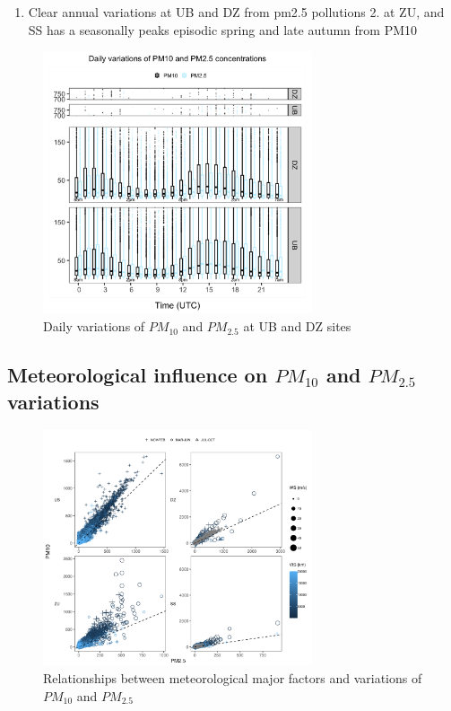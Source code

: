 \documentclass[
  11pt,
]{article}
\providecommand{\tightlist}{%
  \setlength{\itemsep}{0pt}\setlength{\parskip}{0pt}}
\begin{document}
\begin{enumerate}
\def\labelenumi{\arabic{enumi}.}
\tightlist
\item
  Clear annual variations at UB and DZ from pm2.5 pollutions 2. at ZU,
  and SS has a seasonally peaks episodic spring and late autumn from
  PM10
\end{enumerate}

\newpage

\begin{figure}
\centering
\includegraphics[width=3.125in,height=\textheight,keepaspectratio]{images/figure_5.png}
\caption{Daily variations of \(PM_{10}\) and \(PM_{2.5}\) at UB and DZ
sites}
\end{figure}

\newpage
\subsection{Meteorological influence on $PM_{10}$ and $PM_{2.5}$ variations}
\label{subsec2}

\begin{figure}
\centering
\includegraphics[width=3.125in,height=\textheight,keepaspectratio]{images/figure_6.png}
\caption{Relationships between meteorological major factors and
variations of \(PM_{10}\) and \(PM_{2.5}\)}
\end{figure}
\end{document}
